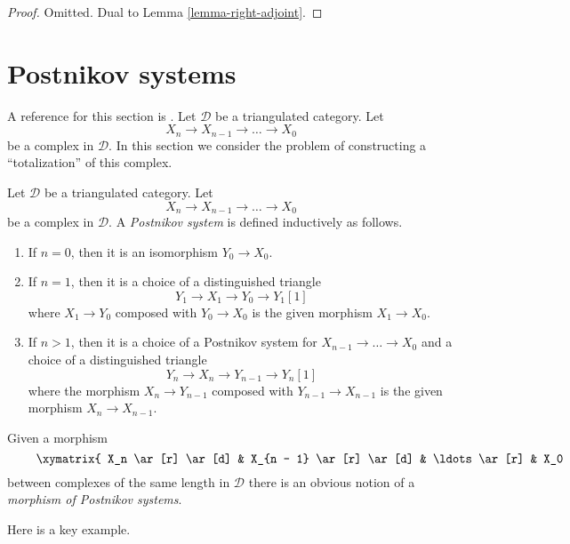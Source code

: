 \begin{proof}
Omitted. Dual to Lemma \ref{lemma-right-adjoint}.
\end{proof}






\section{Postnikov systems}
\label{section-postnikov}

\noindent
A reference for this section is \cite{Orlov-K3}. Let $\mathcal{D}$
be a triangulated category. Let
$$
X_n \to X_{n - 1} \to \ldots \to X_0
$$
be a complex in $\mathcal{D}$. In this section we consider the problem
of constructing a ``totalization'' of this complex.

\begin{definition}
\label{definition-postnikov-system}
Let $\mathcal{D}$ be a triangulated category. Let
$$
X_n \to X_{n - 1} \to \ldots \to X_0
$$
be a complex in $\mathcal{D}$. A {\it Postnikov system} is defined
inductively as follows.
\begin{enumerate}
\item If $n = 0$, then it is an isomorphism $Y_0 \to X_0$.
\item If $n = 1$, then it is a choice of a distinguished triangle
$$
Y_1 \to X_1 \to Y_0 \to Y_1[1]
$$
where $X_1 \to Y_0$ composed with $Y_0 \to X_0$ is the given morphism
$X_1 \to X_0$.
\item If $n > 1$, then it is a choice of a Postnikov system
for $X_{n - 1} \to \ldots \to X_0$ and a choice of a distinguished
triangle
$$
Y_n \to X_n \to Y_{n - 1} \to Y_n[1]
$$
where the morphism $X_n \to Y_{n - 1}$ composed with
$Y_{n - 1} \to X_{n - 1}$ is the given morphism $X_n \to X_{n - 1}$.
\end{enumerate}
Given a morphism
\begin{equation}
\label{equation-map-complexes}
\vcenter{
\xymatrix{
X_n \ar[r] \ar[d] &
X_{n - 1} \ar[r] \ar[d] &
\ldots \ar[r] &
X_0 \ar[d] \\
X'_n \ar[r] &
X'_{n - 1} \ar[r] &
\ldots \ar[r] &
X'_0
}
}
\end{equation}
between complexes of the same length in $\mathcal{D}$
there is an obvious notion of a {\it morphism of Postnikov systems}.
\end{definition}

\noindent
Here is a key example.

